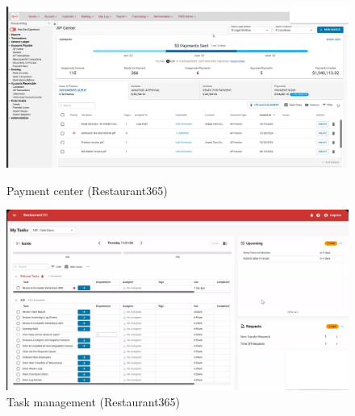 \documentclass[]{VUMIFTemplateClass}
\begin{document}
\begin{figure}[h]
    \centering
    \begin{minipage}{0.48\textwidth}
        \centering
        \includegraphics[width=\textwidth]{images/examples/payment_center_r365.png}
        \caption{Payment center (Restaurant365)}
    \end{minipage}
    \hfill
    \begin{minipage}{0.48\textwidth}
        \centering
        \includegraphics[width=\textwidth]{images/examples/task_management_r365.png}
        \caption{Task management (Restaurant365)}
    \end{minipage}
\end{figure}
\end{document}
